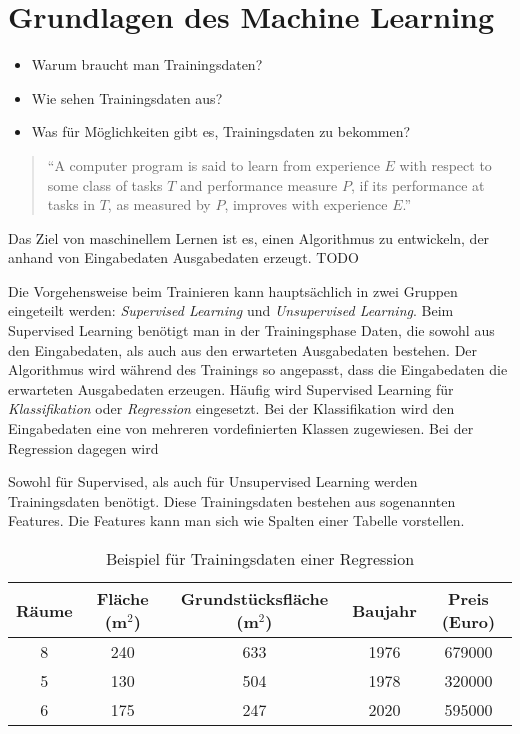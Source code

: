 
\chapter{Grundlagen des Machine Learning}

\begin{itemize}
    \item Warum braucht man Trainingsdaten?
    \item Wie sehen Trainingsdaten aus?
    \item Was für Möglichkeiten gibt es, Trainingsdaten zu bekommen?
\end{itemize}

\begin{quote}
    \enquote{A computer program is said to learn from experience $E$ with respect to some class of tasks $T$ and performance measure $P$, if its performance at tasks in $T$, as measured by $P$, improves with experience $E$.}
\end{quote}

Das Ziel von maschinellem Lernen ist es, einen Algorithmus zu entwickeln, der anhand von Eingabedaten Ausgabedaten erzeugt. TODO

Die Vorgehensweise beim Trainieren kann hauptsächlich in zwei Gruppen eingeteilt werden: \textit{Supervised Learning} und \textit{Unsupervised Learning}. Beim Supervised Learning benötigt man in der Trainingsphase Daten, die sowohl aus den Eingabedaten, als auch aus den erwarteten Ausgabedaten bestehen. Der Algorithmus wird während des Trainings so angepasst, dass die Eingabedaten die erwarteten Ausgabedaten erzeugen. Häufig wird Supervised Learning für \textit{Klassifikation} oder \textit{Regression} eingesetzt. Bei der Klassifikation wird den Eingabedaten eine von mehreren vordefinierten Klassen zugewiesen. Bei der Regression dagegen wird 

Sowohl für Supervised, als auch für Unsupervised Learning werden Trainingsdaten benötigt. Diese Trainingsdaten bestehen aus sogenannten Features. Die Features kann man sich wie Spalten einer Tabelle vorstellen.

\begin{table}[H]
    \centering
    \begin{tabular}{ || c | c | c | c || c || }
        \hline
        Räume & Fläche (m$^2$) & Grundstücksfläche (m$^2$) & Baujahr & Preis (Euro) \\
        \hline
        8 & 240 & 633 & 1976 & 679000 \\
        5 & 130 & 504 & 1978 & 320000 \\
        6 & 175 & 247 & 2020 & 595000 \\
        \hline
    \end{tabular}
    \caption{Beispiel für Trainingsdaten einer Regression}
    \label{tbl:trainingdata}
\end{table}